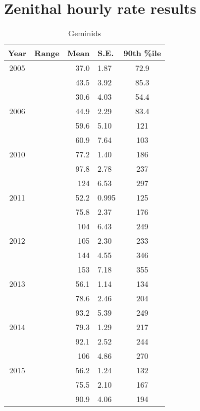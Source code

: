 \chapter{Zenithal hourly rate results}
\label{app:zhr}

\begin{table}
	\centering
	\begin{tabular}{|c|c|r@{ \,$\pm$\, }l|c|}
		\hline 
		Year & Range & Mean & S.E. & 90th \%ile\\ 
		\hline 
		2005 & & 37.0 & 1.87 & 72.9   \\ 
		\hline 
		& & 43.5 & 3.92 & 85.3   \\ 
		\hline 
		& & 30.6 & 4.03 & 54.4   \\ 
		\hline 
		2006 & & 44.9 & 2.29 & 83.4   \\ 
		\hline 
		& &	 59.6 & 5.10 & 121   \\ 
		\hline 
		& & 60.9 & 7.64 & 103   \\ 
		\hline 
		2010 & & 77.2 & 1.40 & 186   \\ 
		\hline 
		& & 97.8 & 2.78 & 237   \\ 
		\hline 
		& &	124 & 6.53 & 297   \\ 
		\hline 
		2011 & & 52.2 & 0.995 & 125   \\ 
		\hline 
		& & 75.8 & 2.37 & 176   \\ 
		\hline 
		& & 104 & 6.43 & 249   \\ 
		\hline 
		2012 & & 105 & 2.30 & 233   \\ 
		\hline
		& & 144 & 4.55 & 346   \\ 
		\hline 
		& & 153 & 7.18 & 355   \\ 
		\hline 
		2013 & & 56.1 & 1.14 & 134   \\ 
		\hline 
		& & 78.6 & 2.46 & 204   \\ 
		\hline 
		& & 93.2 & 5.39 & 249   \\ 
		\hline 
		2014 & & 79.3 & 1.29 & 217   \\ 
		\hline 
		& & 92.1 & 2.52 & 244   \\ 
		\hline 
		& & 106 & 4.86 & 270   \\ 
		\hline 
		2015 & & 56.2 & 1.24 & 132   \\ 
		\hline 
		& & 75.5 & 2.10 & 167   \\ 
		\hline 
		& & 90.9 & 4.06 & 194   \\ 
		\hline 
	\end{tabular} 
\caption{Geminids}
\end{table}


